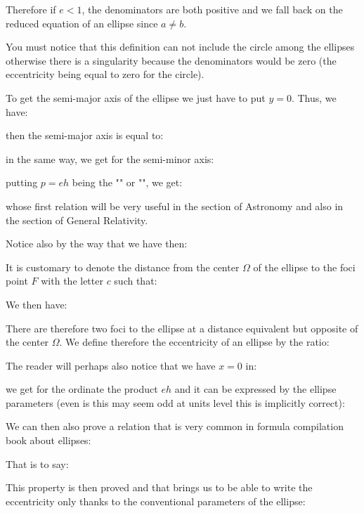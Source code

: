 \begin{enumerate}
		Therefore if $e<1$, the denominators are both positive and we fall back on the reduced equation of an ellipse since $a\neq b$.
		\begin{tcolorbox}[title=Remark,colframe=black,arc=10pt]
		You must notice that this definition can not include the circle among the ellipses otherwise there is a singularity because the denominators would be zero (the eccentricity being equal to zero for the circle).
		\end{tcolorbox}
		To get the semi-major axis of the ellipse we just have to put $y=0$. Thus, we have:
		
		then the semi-major axis is equal to:
		
		in the same way, we get for the semi-minor axis:
		
		putting $p=eh$ being the "\label{parameter of the ellipse}" or "\label{focal parameter of the ellipse}", we get:
		
		whose first relation will be very useful in the section of Astronomy and also in the section of General Relativity.
		
		Notice also by the way that we have then:
		
		
		It is customary to denote the distance from the center $\Omega$ of the ellipse to the foci point $F$ with the letter $c$ such that:
		
		We then have:
		
		There are therefore two foci to the ellipse at a distance equivalent but opposite of the center $\Omega$. We define therefore the eccentricity of an ellipse by the ratio:
		
		The reader will perhaps also notice that we have $x = 0$ in:
		
		we get for the ordinate the product $eh$ and it can be expressed by the ellipse parameters (even is this may seem odd at units level this is implicitly correct):
		
		We can then also prove a relation that is very common in formula compilation book about ellipses:
		
		That is to say:
		
		This property is then proved and that brings us to be able to write the eccentricity only thanks to the conventional parameters of the ellipse:
		

\end{enumerate}
